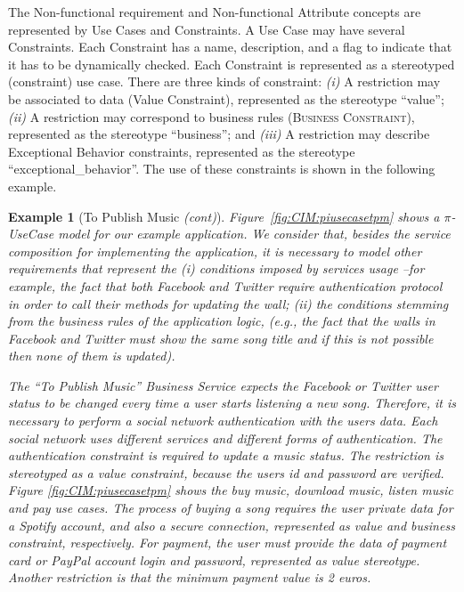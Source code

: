 \documentclass[12pt,twoside]{article}
\theoremstyle{plain}
\theoremstyle{plain}
\newtheorem{example}{Example}
\begin{document}
\begin{multicols}{2}
 The {\sc Non-functional requirement} and {\sc Non-functional Attribute} concepts are represented by {\sc Use Cases} and {\sc Constraints}.
A {\sc Use Case} may have several {\sc Constraints}. Each {\sc Constraint} has a name, description, and a flag to indicate that it has to be  dynamically checked.
Each {\sc Con\-straint} is represented as a stereotyped ({\sf constraint}) use case.
There are three kinds of constraint:
\textit{(i)} A restriction may be associated to data ({\sc Value Constraint}), represented as the stereotype ``value'';
\textit{(ii)} A restriction may correspond to business rules (\textsc{Business Constraint}), represented as the stereotype {\sf ``business''}; and
\textit{(iii)} A restriction may describe {\sc Exceptional Behavior} constraints, represented as the stereotype {\sf ``exceptional\_behavior''}.
The use of these constraints is shown in the following example.

\begin{example}[To Publish Music \textit{(cont)}]\label{ex:toPublicMusic2}
Figure~\ref{fig:CIM:piusecasetpm} shows a $\pi$-UseCase model for our example application.
We consider that, besides the service composition for implementing the application, it is necessary to model  other requirements that represent the (i) conditions imposed by services usage --for example, the fact that both Facebook and Twitter require authentication protocol in order to call their methods for updating the wall; (ii) the conditions stemming from the business rules of the application logic, (e.g., the fact that the walls in Facebook and Twitter must show the same song title and if this is not possible then none of them is updated).

The ``To Publish Music'' Business Service expects  the Facebook or Twitter user status to be changed every time a user starts listening a new song.
Therefore, it is necessary to perform a social network authentication with the users data. Each social network uses different services and different forms of authentication. The authentication constraint is required to update a music status. The restriction is stereotyped as a value constraint, because the users id and password are verified.  Figure \ref{fig:CIM:piusecasetpm} shows the buy music, download music, listen music and pay use cases. The process of buying a song requires the user private data for a Spotify account, and also a secure connection, represented as value and business constraint, respectively. For payment, the user must provide the data of payment card or PayPal account login and password, represented as value stereotype.
Another restriction is that the minimum payment value is 2 euros.
\end{example}


\end{multicols}
\end{document}
